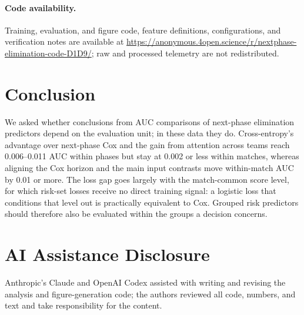 \documentclass[sigconf,anonymous]{acmart}
\newcommand{\artifacturl}{\url{https://anonymous.4open.science/r/nextphase-elimination-code-D1D9/}}
\begin{document}
\paragraph{Code availability.}
Training, evaluation, and figure code, feature definitions, configurations, and verification notes are available at \artifacturl{}; raw and processed telemetry are not redistributed.

\section{Conclusion}
\label{sec:conclusion}
We asked whether conclusions from AUC comparisons of next-phase elimination predictors depend on the evaluation unit; in these data they do. Cross-entropy's advantage over next-phase Cox and the gain from attention across teams reach 0.006--0.011 AUC within phases but stay at 0.002 or less within matches, whereas aligning the Cox horizon and the main input contrasts move within-match AUC by 0.01 or more. The loss gap goes largely with the match-common score level, for which risk-set losses receive no direct training signal: a logistic loss that conditions that level out is practically equivalent to Cox. Grouped risk predictors should therefore also be evaluated within the groups a decision concerns.

\section*{AI Assistance Disclosure}
Anthropic's Claude and OpenAI Codex assisted with writing and revising the analysis and figure-generation code; the authors reviewed all code, numbers, and text and take responsibility for the content.



\end{document}
